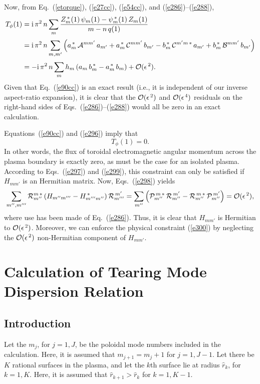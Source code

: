 \documentclass[12pt,prb,aps]{revtex4-1}
\begin{document}
Now, from Eq.~(\ref{etorque}), (\ref{e27cc}), (\ref{e54cc}), and (\ref{e286})--(\ref{e288}), 
\begin{align}\label{e299}
T_\phi(1) &= {\rm i}\,\pi^2\,n\sum_{m}\frac{Z_m^{\,\ast}(1)\,\psi_m(1)-\psi_m^{\,\ast}(1)\,Z_m(1)}{m-n\,q(1)}\nonumber\\[0.5ex]
&={\rm i}\,\pi^2\,n\sum_{m,m'}\left(a_m^{\,\ast}\,{\cal A}^{mm'}\,a_{m'} + a_m^{\,\ast}\,{\cal C}^{mm'}\,b_{m'}-b_m^{\,\ast}\,{\cal C}^{m'm\,\ast}\,a_{m'}
+b_m^{\,\ast}\,{\cal B}^{mm'}\,b_{m'}\right)\nonumber\\[0.5ex]
&= -{\rm i}\,\pi^2\,n\sum_m h_m\,(a_m\,b_m^{\,\ast}-a_m^{\,\ast}\,b_m) + {\cal O}(\epsilon^{\,2}).
\end{align}
Given that Eq.~(\ref{e90cc}) is an exact result (i.e., it is independent of our inverse aspect-ratio expansion), it is clear that the 
${\cal O}(\epsilon^{\,2})$ and ${\cal O}(\epsilon^{\,4})$ residuals on the right-hand sides of Eqs.~(\ref{e286})--(\ref{e288})
would all be zero in an exact calculation.

Equations~(\ref{e90cc}) and (\ref{e296}) imply that 
\begin{equation}\label{e300}
T_\phi(1)=0. 
\end{equation}
In other words, the flux of toroidal electromagnetic angular momentum across the plasma boundary is
exactly zero, as must be the case for an isolated plasma.  According to Eqs.~(\ref{e297}) and (\ref{e299}), this constraint can only be satisfied if  $H_{mm'}$ is an Hermitian matrix. 
Now, Eqs.~(\ref{e298}) yields 
\begin{equation}
\sum_{m'',m'''}{\cal R}_{m''}^{m\,\ast}\,(H_{m''m'''}-H_{m'''m''}^{\,\ast})\,{\cal R}_{m'''}^{\,m'}=\sum_{m''}\left({\cal P}_{m''}^{\,m\,\ast}\,{\cal R}_{m''}^{\,m'}- {\cal R}_{m''}^{\,m\,\ast}\,{\cal P}_{m''}^{\,m'}\right)={\cal O}(\epsilon^{\,2}),
\end{equation}
where use has been made of Eq.~(\ref{e286}). Thus, it is clear that $H_{mm'}$ is Hermitian to ${\cal O}(\epsilon^{\,2})$. 
Moreover, we can enforce the physical constraint  (\ref{e300}) by neglecting the ${\cal O}(\epsilon^{\,2})$ non-Hermitian
component of $H_{mm'}$.

\section{Calculation of  Tearing Mode Dispersion Relation}
\subsection{Introduction}
Let the $m_j$, for $j=1,J$, be the poloidal mode numbers included in the calculation. Here, it is assumed that $m_{j+1}=m_j+1$ for $j=1,J-1$. 
Let there be $K$ rational surfaces in the plasma, and let the $k$th surface lie at radius $\hat{r}_k$, for $k=1,K$. Here,
it is assumed that $\hat{r}_{k+1}>\hat{r}_k$ for $k=1,K-1$. 
\end{document}
